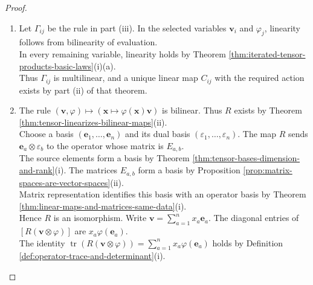 \begin{proposition}
\begin{proof}
\begin{enumerate}[label=(\roman*)]
For $K=(k_1,\ldots,k_p)$, set $\delta_{K,I}\defeq\prod\limits_{a=1}^{p}\delta_{k_a,i_a}$. For $L=(\ell_1,\ldots,\ell_q)$, set $\delta_{J,L}\defeq\prod\limits_{b=1}^{q}\delta_{j_b,\ell_b}$.\\
Set $\boldsymbol{\varepsilon}_K\defeq(\varepsilon_{k_1},\ldots,\varepsilon_{k_p})$. Set $\mathbf{e}_L\defeq(\mathbf{e}_{\ell_1},\ldots,\mathbf{e}_{\ell_q})$. The defining formula implies $\Theta_{p,q}(\mathbf{b}_{I,J})(\boldsymbol{\varepsilon}_K,\mathbf{e}_L)=\delta_{K,I}\delta_{J,L}$.\\
If $z\in\ker\Theta_{p,q}$, evaluation at $(\boldsymbol{\varepsilon}_I,\mathbf{e}_J)$ equals both zero and the coefficient of $\mathbf{b}_{I,J}$ in $z$.\\
Thus every coefficient is zero, so $\Theta_{p,q}$ is injective. It is an isomorphism by Corollary \ref{cor:equal-dimension-kernel-range}(ii).
\item Let $\Gamma_{ij}$ be the rule in part (iii). In the selected variables $\mathbf{v}_i$ and $\varphi_j$, linearity follows from bilinearity of evaluation.\\
In every remaining variable, linearity holds by Theorem \ref{thm:iterated-tensor-products-basic-laws}(i)(a).\\
Thus $\Gamma_{ij}$ is multilinear, and a unique linear map $C_{ij}$ with the required action exists by part (ii) of that theorem.
\item The rule $(\mathbf{v},\varphi)\mapsto(\mathbf{x}\mapsto\varphi(\mathbf{x})\mathbf{v})$ is bilinear. Thus $R$ exists by Theorem \ref{thm:tensor-linearizes-bilinear-maps}(ii).\\
Choose a basis $(\mathbf{e}_1,\ldots,\mathbf{e}_n)$ and its dual basis $(\varepsilon_1,\ldots,\varepsilon_n)$. The map $R$ sends $\mathbf{e}_a\otimes\varepsilon_b$ to the operator whose matrix is $E_{a,b}$.\\
The source elements form a basis by Theorem \ref{thm:tensor-bases-dimension-and-rank}(i). The matrices $E_{a,b}$ form a basis by Proposition \ref{prop:matrix-spaces-are-vector-spaces}(ii).\\
Matrix representation identifies this basis with an operator basis by Theorem \ref{thm:linear-maps-and-matrices-same-data}(i).\\
Hence $R$ is an isomorphism. Write $\mathbf{v}=\sum\limits_{a=1}^{n}x_a\mathbf{e}_a$. The diagonal entries of $[R(\mathbf{v}\otimes\varphi)]$ are $x_a\varphi(\mathbf{e}_a)$.\\
The identity $\operatorname{tr}(R(\mathbf{v}\otimes\varphi))=\sum\limits_{a=1}^{n}x_a\varphi(\mathbf{e}_a)$ holds by Definition \ref{def:operator-trace-and-determinant}(i).\\

\end{enumerate}
\end{proof}
\end{proposition}
